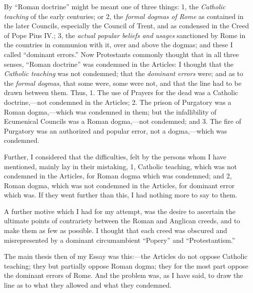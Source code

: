 By ``Roman doctrine'' might be meant one of three things: 1,
the \emph{Catholic teaching} of the early centuries; or 2, the \emph{formal
dogmas of Rome} as contained in the later Councils, especially
the Council of Trent, and as condensed in the Creed of Pope Pius IV.; 3,
the \emph{actual popular beliefs and usages} sanctioned by Rome in the
countries in communion with it, over and above the dogmas; and these I
called ``dominant errors.'' Now Protestants commonly thought
that in all three senses, ``Roman doctrine'' was condemned in the
Articles: I thought that the \emph{Catholic teaching} was not condemned;
that the \emph{dominant errors} were; and as to the \emph{formal dogmas},
that some were, some were not, and that the line had to be drawn between
them. Thus, 1. The use of Prayers for the dead was a Catholic
doctrine,—not condemned in the Articles; 2. The prison of
Purgatory was a Roman dogma,—which was condemned in them; but
the infallibility of Ecumenical Councils was a Roman dogma,—not
condemned; and 3. The fire of Purgatory was an authorized and popular
error, not a dogma,—which was condemned.

Further, I considered that the difficulties, felt by the persons whom
I have mentioned, mainly lay in their mistaking, 1, Catholic teaching,
which was not condemned in the Articles, for Roman dogma which was
condemned; and 2, Roman dogma, which was not condemned in the Articles,
for dominant error which was. If they went further than this, I had
nothing more to say to them.

A further motive which I had for my attempt, was the desire to
ascertain the ultimate points of contrariety between the Roman and
Anglican creeds, and to make them as few as possible. I thought that
each creed was obscured and misrepresented by a dominant circumambient
``Popery'' and ``Protestantism.''

The main thesis then of my Essay was this:—the Articles do not
oppose Catholic teaching; they but partially oppose Roman dogma; they
for the most part oppose the dominant errors of Rome. And the problem
was, as I have said, to draw the line as to what they allowed
and what they condemned.

